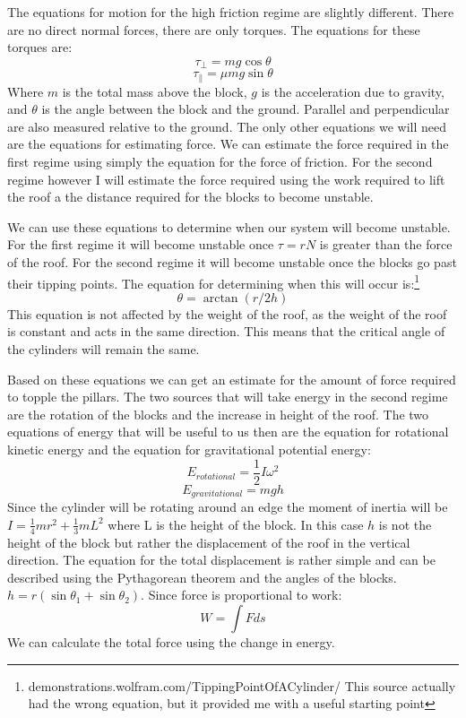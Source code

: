 \documentclass[two column]{article}
\begin{document}
The equations for motion for the high friction regime are slightly different. There are no direct normal forces, there are only torques. The equations for these torques are:
$$\tau_{\perp}=mg\cos\theta$$
$$\tau_{\parallel}=\mu mg\sin\theta$$
Where $m$ is the total mass above the block, $g$ is the acceleration due to gravity, and $\theta$ is the angle between the block and the ground. Parallel and perpendicular are also measured relative to the ground.
The only other equations we will need are the equations for estimating force. We can estimate the force required in the first regime using simply the equation for the force of friction. For the second regime however I will estimate the force required using the work required to lift the roof a the distance required for the blocks to become unstable.

We can use these equations to determine when our system will become unstable. For the first regime it will become unstable once $\tau=rN$ is greater than the force of the roof. For the second regime it will become unstable once the blocks go past their tipping points. The equation for determining when this will occur is:\footnote{demonstrations.wolfram.com/TippingPointOfACylinder/ This source actually had the wrong equation, but it provided me with a useful starting point}
$$\theta=\arctan(r/2h)$$
This equation is not affected by the weight of the roof, as the weight of the roof is constant and acts in the same direction. This means that the critical angle of the cylinders will remain the same.

Based on these equations we can get an estimate for the amount of force required to topple the pillars. The two sources that will take energy in the second regime are the rotation of the blocks and the increase in height of the roof. The two equations of energy that will be useful to us then are the equation for rotational kinetic energy and the equation for gravitational potential energy:
$$E_{rotational}=\frac{1}{2}I\omega^2$$
$$E_{gravitational}=mgh$$
Since the cylinder will be rotating around an edge the moment of inertia will be $I=\frac{1}{4}mr^2+\frac{1}{3}mL^2$ where L is the height of the block. In this case $h$ is not the height of the block but rather the displacement of the roof in the vertical direction. The equation for the total displacement is rather simple and can be described using the Pythagorean theorem and the angles of the blocks. $h=r(\sin\theta_1+\sin\theta_2)$. Since force is proportional to work:
$$W=\int Fds$$
We can calculate the total force using the change in energy.
\end{document}
